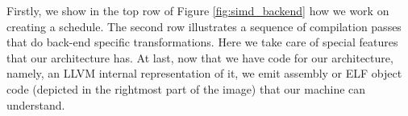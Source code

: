 

Firstly, we show in the top row of Figure \ref{fig:simd_backend} how we work on creating a schedule. The second row illustrates a sequence of compilation passes that do back-end specific transformations. Here we take care of special features that our architecture has. At last, now that we have code for our architecture, namely, an LLVM internal representation of it, we emit assembly or ELF object code (depicted in the rightmost part of the image) that our machine can understand.

